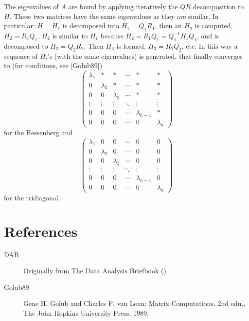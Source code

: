 \documentclass{article}
\begin{document}
The eigenvalues of $A$ are found by applying iteratively the $QR$ decomposition to $H$. These two matrices have the same eigenvalues as they are similar.
In particular: $H = H_1$ is decomposed into $H_1 = Q_1R_1$, then an $H_2$ is computed, $H_2 = R_1Q_1$. $H_2$ is similar to $H_1$ because $H_2 = R_1Q_1 = Q_1^{-1}H_1Q_1$, and is decomposed to $H_2 = Q_2R_2$. Then $H_3$ is formed, $H_3 = R_2Q_2$, etc. In this way a sequence of $H_i$'s (with the same eigenvalues) is generated, that finally converges to (for conditions, see [Golub89])
\[
\begin{pmatrix}
 \lambda_1 & * & * & \cdots & * & * \\
 0 & \lambda_2 & * & \cdots & * & * \\
 0 & 0 & \lambda_3 & \cdots & * & * \\
 \vdots & \vdots & \vdots & \ddots & \vdots & \vdots \\
 0 & 0 & 0 & \cdots & \lambda_{n-1} & * \\
 0 & 0 & 0 & \cdots & 0 & \lambda_n 
\end{pmatrix}
\]
for the Hessenberg and
\[
\begin{pmatrix}
 \lambda_1 & 0 & 0 & \cdots & 0 & 0 \\
 0 & \lambda_2 & 0 & \cdots & 0 & 0 \\
 0 & 0 & \lambda_3 & \cdots & 0 & 0 \\
 \vdots & \vdots & \vdots & \ddots & \vdots & \vdots \\
 0 & 0 & 0 & \cdots & \lambda_{n-1} & 0 \\
 0 & 0 & 0 & \cdots & 0 & \lambda_n
\end{pmatrix}
\]
for the tridiagonal.

\section*{References}


\begin{description}
\item[DAB] Originally from The Data Analysis Briefbook
()
\item[Golub89]
Gene H. Golub and Charles F. van Loan: Matrix Computations, 2nd edn., The John Hopkins University Press, 1989.
\end{description}
\end{document}
